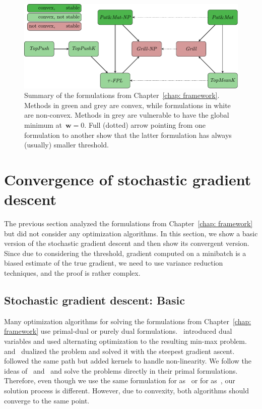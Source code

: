 \begin{figure}[!ht]
  \centering
  \includegraphics[width = \linewidth]{images/methods_relation.pdf}
  \caption{Summary of the formulations from Chapter~\ref{chap: framework}. Methods in green and grey are convex, while formulations in white are non-convex. Methods in grey are vulnerable to have the global minimum at~$\bm{w}=0$. Full (dotted) arrow pointing from one formulation to another show that the latter formulation has always (usually) smaller threshold.}
  \label{fig:thresholds}
\end{figure}

\section{Convergence of stochastic gradient descent}\label{sec:convergence}

The previous section analyzed the formulations from Chapter~\ref{chap: framework} but did not consider any optimization algorithms. In this section, we show a basic version of the stochastic gradient descent and then show its convergent version. Since due to considering the threshold, gradient computed on a minibatch is a biased estimate of the true gradient, we need to use variance reduction techniques, and the proof is rather complex.

\subsection{Stochastic gradient descent: Basic}

Many optimization algorithms for solving the formulations from Chapter~\ref{chap: framework} use primal-dual or purely dual formulations.~\cite{eban2017scalable} introduced dual variables and used alternating optimization to the resulting min-max problem. ~\cite{li2014top} and~\cite{zhang2018tau} dualized the problem and solved it with the steepest gradient ascent.~\cite{macha2020nonlinear} followed the same path but added kernels to handle non-linearity. We follow the ideas of~\cite{mackey2018constrained} and~\cite{adam2019machine} and solve the problems directly in their primal formulations. Therefore, even though we use the same formulation for \TopPush as~\cite{li2014top} or for \tauFPL as~\cite{zhang2018tau}, our solution process is different. However, due to convexity, both algorithms should converge to the same point.

